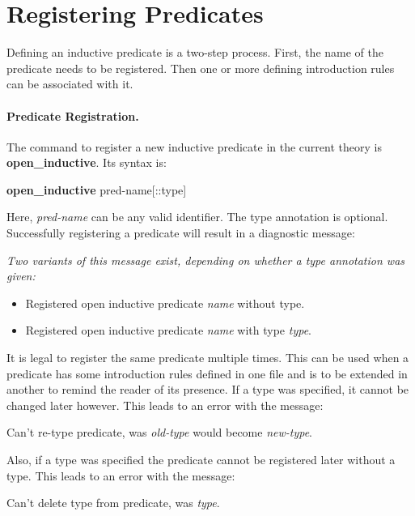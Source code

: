 \section{Registering Predicates}

Defining an inductive predicate is a two-step process.
%
First, the name of the predicate needs to be registered.
%
Then one or more defining introduction rules can be associated with it.
%

\paragraph{Predicate Registration.} The command to register a new inductive predicate in the current theory is \textbf{open\_inductive}.
%
Its syntax is:
%

\begin{cmd} \label{cmdopen}
\textbf{open\_inductive} pred-name[::type]
\end{cmd}
Here, \emph{pred-name} can be any valid identifier.
%
The type annotation is optional.
%
Successfully registering a predicate will result in a diagnostic message:

\begin{msg}
\emph{Two variants of this message exist, depending on whether a type annotation was given:}
\begin{itemize}
\item Registered open inductive predicate \emph{name} without type.
\item Registered open inductive predicate \emph{name} with type \emph{type}.
\end{itemize}
\end{msg}

It is legal to register the same predicate multiple times.
%
This can be used when a predicate has some introduction rules defined in one file and is to be extended in another to remind the reader of its presence.
%
If a type was specified, it cannot be changed later however.
%
This leads to an error with the message:
%

\begin{err}
Can't re-type predicate, was \emph{old-type} would become \emph{new-type}.
\end{err}

Also, if a type was specified the predicate cannot be registered later without a type.
%
This leads to an error with the message:
%

\begin{err}
Can't delete type from predicate, was \emph{type}.
\end{err}

